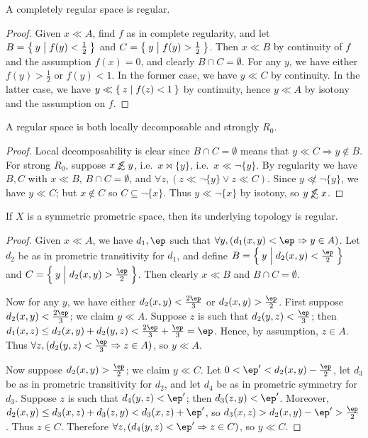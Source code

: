 \documentclass{article}
\def\oapt{\mathrel{\!\not\,\not\lesssim}}
\def\cpl#1{\neg #1}
\let\implies\Rightarrow
\def\hfep{\frac{\ep}{2}}
\def\singleton#1{\{#1\}}
\begin{document}
\begin{lem}\label{thm:creg-reg}
  A completely regular space is regular.
\end{lem}
\begin{proof}
  Given $x\ll A$, find $f$ as in complete regularity, and let $B = \Set{y|f(y)<\frac12}$ and $C = \Set{y|f(y)>\frac12}$.
  Then $x\ll B$ by continuity of $f$ and the assumption $f(x)=0$, and clearly $B\cap C = \emptyset$.
  For any $y$, we have either $f(y)>\frac12$ or $f(y)<1$.
  In the former case, we have $y \ll C$ by continuity.
  In the latter case, we have $y \ll \Set{z|f(z)<1}$ by continuity, hence $y\ll A$ by isotony and the assumption on $f$.
\end{proof}

\begin{thm}
  A regular space is both locally decomposable and strongly $R_0$.
\end{thm}
\begin{proof}
  Local decomposability is clear since $B\cap C=\emptyset$ means that $y\ll C \implies y\notin B$.
  For strong $R_0$, suppose $x\oapt y$, i.e.\ $x\bowtie \singleton{y}$, i.e.\ $x\ll \cpl{\singleton{y}}$.
  By regularity we have $B,C$ with $x\ll B$, $B\cap C = \emptyset$, and $\forall z, (z\ll \cpl{\singleton{y}} \lor z\ll C)$.
  Since $y\not\ll \cpl{\singleton{y}}$, we have $y\ll C$; but $x\notin C$ so $C\subseteq \cpl{\singleton{x}}$.
  Thus $y\ll\cpl{\singleton{x}}$ by isotony, so $y\oapt x$.
\end{proof}

\begin{thm}\label{thm:sympmet-reg}
  If $X$ is a symmetric prometric space, then its underlying topology is regular.
\end{thm}
\begin{proof}
  Given $x\ll A$, we have $d_1,\ep$ such that $\forall y, (d_1(x,y)<\ep \implies y\in A)$.
  Let $d_2$ be as in prometric transitivity for $d_1$, and define $B = \setof{y|d_2(x,y)<\hfep}$ and $C = \setof{y|d_2(x,y)>\hfep}$.
  Then clearly $x\ll B$ and $B\cap C = \emptyset$.

  Now for any $y$, we have either $d_2(x,y)<\frac{2\ep}3$ or $d_2(x,y)>\hfep$.
  First suppose $d_2(x,y)<\frac{2\ep}3$; we claim $y\ll A$.
  Suppose $z$ is such that $d_2(y,z)<\frac{\ep}{3}$; then $d_1(x,z) \le d_2(x,y)+d_2(y,z) < \frac{2\ep}{3} + \frac{\ep}{3} = \ep$.
  Hence, by assumption, $z\in A$.
  Thus $\forall z, (d_2(y,z)<\frac{\ep}{3} \implies z\in A)$, so $y\ll A$.

  Now suppose $d_2(x,y)>\hfep$; we claim $y\ll C$.
  Let $0<\ep' < d_2(x,y)-\hfep$, let $d_3$ be as in prometric transitivity for $d_2$, and let $d_4$ be as in prometric symmetry for $d_3$.
  Suppose $z$ is such that $d_4(y,z)<\ep'$; then $d_3(z,y)<\ep'$.
  Moreover, $d_2(x,y) \le d_3(x,z) + d_3(z,y) < d_3(x,z) + \ep'$, so $d_3(x,z) > d_2(x,y) - \ep' > \hfep$.
  Thus $z\in C$.
  Therefore $\forall z, (d_4(y,z)<\ep' \implies z\in C)$, so $y\ll C$.
\end{proof}
\end{document}
